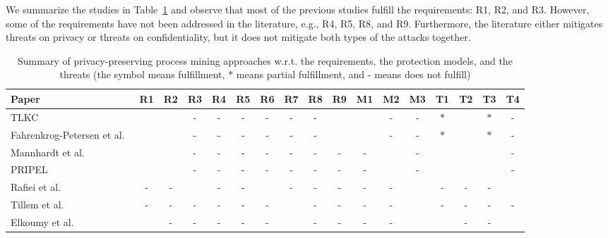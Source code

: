 \documentclass[manuscript]{acmart}
\newcommand{\cmark}{\ding{51}}%
\begin{document}
We summarize the studies in Table~\ref{tbl:related_work} and observe that most of the previous studies fulfill the requirements: R1, R2, and R3. However, some of the requirements have not been addressed in the literature, e.g., R4, R5, R8, and R9. Furthermore, the literature either mitigates threats on privacy or threats on confidentiality, but it does not mitigate both types of the attacks together.

\begin{table}[hbtp]
	\centering	
	\caption{Summary of privacy-preserving process mining approaches w.r.t. the requirements, the protection models, and the threats (the symbol \cmark means fulfillment, $\ast$ means partial fulfillment, and - means does not fulfill)}
	\begin{tabular}[t] { |p{2.8cm}||c|c|c|c|c|c|c|c|c||c|c|c||c|c|c|c|}
		\hline
		
		Paper     &R1&R2&R3& R4&R5&R6&R7&R8&R9& M1&M2&M3 & T1&T2&T3&T4\\\hline 
		    TLKC~\cite{rafiei2020tlkc} &\cmark & \cmark& - & - & - & - & - & - 
		    &\cmark&\cmark & - & - & $\ast$ &\cmark&$\ast$&- \\\hline
		    
		    Fahrenkrog-Petersen et 
		    al.~\cite{fahrenkrog2019pretsa,bauer2019elpaas} &\cmark & \cmark& 
		    -&-&-&-& -&-&\cmark&\cmark&-&-&$\ast$&\cmark&$\ast$&-\\\hline
		    
		    Mannhardt et al.~\cite{mannhardt2019privacy} &\cmark & \cmark& 
		    -&-&-&-& -&-&-&-&\cmark&-&\cmark&\cmark&\cmark&-\\\hline
		    
		    PRIPEL~\cite{fahrenkrog2020pripel} &\cmark & \cmark& -&-&-&-& 
		    -&-&-&-&\cmark&-&\cmark&\cmark&\cmark&- \\\hline
		    
		    Rafiei et al.~\cite{rafieiWA19_short,rafiei2018ensuring} &- & 
		    -& \cmark&-&-&\cmark& -&-&-&-&-&\cmark&-&-&-&\cmark\\\hline
		    
		    Tillem et al.~\cite{tillem2017mining}&- & -& -&-&-&-&\cmark&-& 
		    -&-&-&\cmark&-&-&-&- \\\hline
		    
		    Elkoumy et al.~\cite{elkoumy2020secure,elkoumy2020shareprom} 
		    &\cmark & -& -&-&-&-& 
		    \cmark&-&-&-&-&\cmark&\cmark&-&-&\cmark\\\hline
	\end{tabular}
	
	\label{tbl:related_work}
\end{table}
\end{document}
